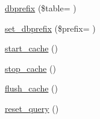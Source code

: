 \begin{DoxyCompactItemize}
\item 
\hyperlink{class_c_i___d_b__query__builder_a1e6bfc7a51f973e57bc948474e699e96}{dbprefix} (\$table= \textquotesingle{}\textquotesingle{})
\item 
\hyperlink{class_c_i___d_b__query__builder_a18182914d989b4d6781bda1163db31d7}{set\+\_\+dbprefix} (\$prefix= \textquotesingle{}\textquotesingle{})
\item 
\hyperlink{class_c_i___d_b__query__builder_a2d4f0c7b71f87dc7ca7f7fcfbdd12ba0}{start\+\_\+cache} ()
\item 
\hyperlink{class_c_i___d_b__query__builder_a612e54a6230b7e899c4d2a42a234bd5a}{stop\+\_\+cache} ()
\item 
\hyperlink{class_c_i___d_b__query__builder_aa3c94d79d552f6e10277b01c447ebbb6}{flush\+\_\+cache} ()
\item 
\hyperlink{class_c_i___d_b__query__builder_a66636a017a1115d983424cdfca677ddf}{reset\+\_\+query} ()
\end{DoxyCompactItemize}
